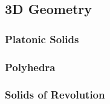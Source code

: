 \subsection{3D Geometry}


\subsubsection{Platonic Solids}

\subsubsection{Polyhedra}

\subsubsection{Solids of Revolution}


